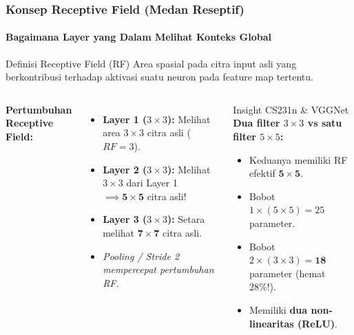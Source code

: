 \documentclass[t,aspectratio=169,xcolor=dvipsnames]{beamer}
\begin{document}
\begin{frame}
    \frametitle{Konsep Receptive Field (Medan Reseptif)}
    \framesubtitle{Bagaimana Layer yang Dalam Melihat Konteks Global}
    \footnotesize

    \begin{block}{Definisi Receptive Field (RF)}
        Area spasial pada citra input asli yang berkontribusi terhadap aktivasi suatu neuron pada feature map tertentu.
    \end{block}

    \begin{columns}[t]
        \textbf{Pertumbuhan Receptive Field:}
        \begin{itemize}
            \item \textbf{Layer 1 ($3\times3$):} Melihat area $3\times3$ citra asli ($RF=3$).
            \item \textbf{Layer 2 ($3\times3$):} Melihat $3\times3$ dari Layer 1 $\implies \mathbf{5\times5}$ citra asli!
            \item \textbf{Layer 3 ($3\times3$):} Setara melihat $\mathbf{7\times7}$ citra asli.
            \item \textit{Pooling / Stride 2 mempercepat pertumbuhan RF.}
        \end{itemize}

        \begin{exampleblock}{Insight CS231n \& VGGNet}
            \textbf{Dua filter $3\times3$ vs satu filter $5\times5$:}
            \begin{itemize}
                \item Keduanya memiliki RF efektif $\mathbf{5\times5}$.
                \item Bobot $1 \times (5\times5) = 25$ parameter.
                \item Bobot $2 \times (3\times3) = \mathbf{18}$ parameter (hemat 28\%!).
                \item Memiliki \textbf{dua non-linearitas (ReLU)}.
            \end{itemize}
        \end{exampleblock}
    \end{columns}
\end{frame}
\end{document}
